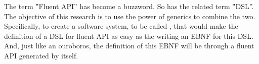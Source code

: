 The term ‟Fluent API” has become a buzzword. So has the related term
‟DSL”. The objective of this research is to use the power of \Java generics
to combine the two. Specifically, to create a software system, to be called
\Self, that would make the definition of a DSL for fluent API as easy as the
writing an EBNF for this DSL\@. And, just like an ouroboros, the definition of this
EBNF will be through a fluent API generated by \Self itself.
